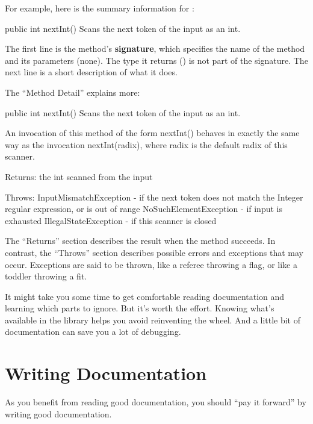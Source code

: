 For example, here is the summary information for :

\begin{stdout}
public int nextInt()
Scans the next token of the input as an int.
\end{stdout}


The first line is the method's {\bf signature}, which specifies the name of the method and its parameters (none). The type it returns () is not part of the signature.
The next line is a short description of what it does.

The ``Method Detail'' explains more:

\begin{stdout}
public int nextInt()
Scans the next token of the input as an int.

An invocation of this method of the form nextInt() behaves in
exactly the same way as the invocation nextInt(radix), where
radix is the default radix of this scanner.

Returns:
the int scanned from the input

Throws:
InputMismatchException - if the next token does not match
    the Integer regular expression, or is out of range
NoSuchElementException - if input is exhausted
IllegalStateException - if this scanner is closed
\end{stdout}

The ``Returns'' section describes the result when the method succeeds.
In contrast, the ``Throws'' section describes possible errors and exceptions that may occur.
Exceptions are said to be thrown, like a referee throwing a flag, or like a toddler throwing a fit.

It might take you some time to get comfortable reading documentation and learning which parts to ignore.
But it's worth the effort.
Knowing what's available in the library helps you avoid reinventing the wheel.
And a little bit of documentation can save you a lot of debugging.


\section{Writing Documentation}

As you benefit from reading good documentation, you should ``pay it forward'' by writing good documentation.



